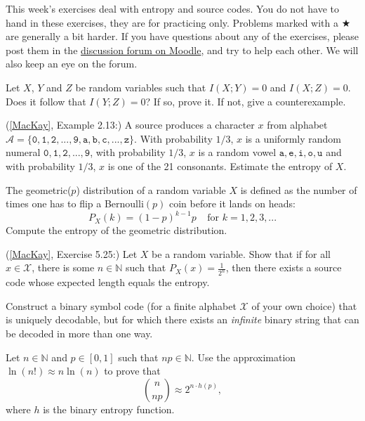 \documentclass[a4paper,10pt,landscape,twocolumn]{scrartcl}
\begin{document}
\practiceproblems

{\sffamily\noindent
This week's exercises deal with entropy and source codes. You do not have to hand in these exercises, they are for practicing only. Problems marked with a $\bigstar$ are generally a bit harder. If you have questions about any of the exercises, please post them in the \href{https://www.moodle.ch/lms/mod/forum/view.php?id=1761}{discussion forum on Moodle}, and try to help each other. We will also keep an eye on the forum.
}

\begin{exercise}
Let $X$, $Y$ and $Z$ be random variables such that $I(X;Y) = 0$ and $I(X;Z) = 0$. Does it follow that $I(Y;Z) = 0$? If so, prove it. If not, give a counterexample.
\end{exercise}

\begin{exercise}
(\href{http://www.inference.phy.cam.ac.uk/mackay/itila/book.html}{[MacKay]}, Example 2.13:) A source produces a character $x$ from alphabet $\mathcal{A} = \{\mathtt{0, 1, 2, ..., 9, a, b, c, ..., z}\}$. With probability $1/3$, $x$ is a uniformly random numeral $\mathtt{0,1,2,...,9}$, with probability $1/3$, $x$ is a random vowel $\mathtt{a,e,i,o,u}$ and with probability $1/3$, $x$ is one of the 21 consonants. Estimate the entropy of $X$.
\end{exercise}

\begin{exercise}
The geometric($p$) distribution of a random variable $X$ is defined as the number of times one has to flip a Bernoulli$(p)$ coin before it lands on heads:
\[
P_X(k) = (1-p)^{k-1}p \ \ \ \ \ \mbox{for } k = 1, 2, 3, ...
\]
Compute the entropy of the geometric distribution.
\end{exercise}

\begin{exercise}
(\href{http://www.inference.phy.cam.ac.uk/mackay/itila/book.html}{[MacKay]}, Exercise 5.25:) Let $X$ be a random variable. Show that if for all $x \in \mathcal{X}$, there is some $n \in \mathbb{N}$ such that $P_X(x) = \frac{1}{2^n}$, then there exists a source code whose expected length equals the entropy. 
\end{exercise}

\begin{exercise}
Construct a binary symbol code (for a finite alphabet $\mathcal{X}$ of your own choice) that is uniquely decodable, but for which there exists an \emph{infinite} binary string that can be decoded in more than one way.
\end{exercise}

\begin{exercise}
Let $n \in \mathbb{N}$ and $p \in [0,1]$ such that $np \in \mathbb{N}$. Use the approximation $\ln(n!) \approx n \ln(n)$ to prove that
\[
{n \choose np} \approx 2^{n \cdot h(p)},
\]
where $h$ is the binary entropy function.
\end{exercise}
\end{document}
